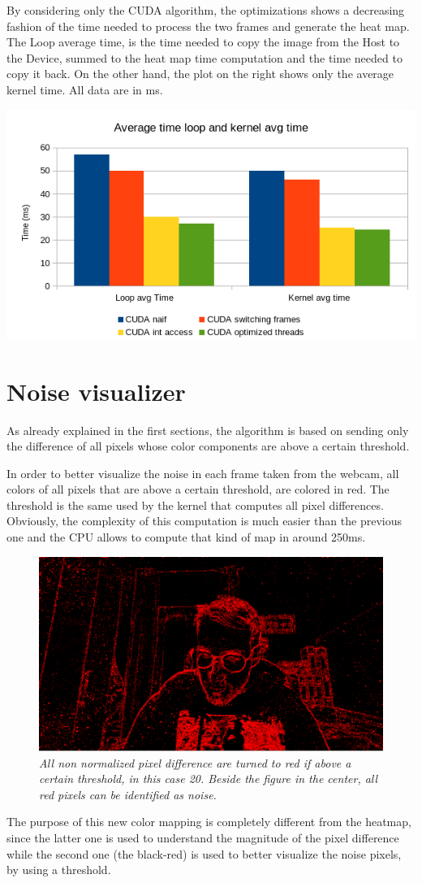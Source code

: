 \documentclass[paper=a4, fontsize=10pt]{scrartcl}	%
\begin{document}
	By considering only the CUDA algorithm, the optimizations shows a decreasing fashion of the time needed to process the two frames and generate the heat map. The Loop average time, is the time needed to copy the image from the Host to the Device, summed to the heat map time computation and the time needed to copy it back. On the other hand, the plot on the right shows only the average kernel time. All data are in ms. 
	\begin{center}
		\includegraphics[width=0.65\linewidth]{images/heatmap/histo_results}
	\end{center}
	
	
	\section{Noise visualizer}
	\label{sec:noise_visualizer}
	As already explained in the first sections, the algorithm is based on sending only the difference of all pixels whose color components are above a certain threshold.
	
	In order to better visualize the noise in each frame taken from the webcam, all colors of all pixels that are above a certain threshold, are colored in red. The threshold is the same used by the kernel that computes all pixel differences. Obviously, the complexity of this computation is much easier than the previous one and the CPU allows to compute that kind of map in around 250ms.
	\begin{figure}[H]
		\centering
		\includegraphics[width=0.4\linewidth]{images/heatmap/v0-red}
		\caption{\textit{All non normalized pixel difference are turned to red if above a certain threshold, in this case 20. Beside the figure in the center, all red pixels can be identified as noise.}}
		\label{fig:v0-red}
	\end{figure}
	The purpose of this new color mapping is completely different from the heatmap, since the latter one is used to understand the magnitude of the pixel difference while the second one (the black-red) is used to better visualize the noise pixels, by using a threshold.
	
\end{document}

